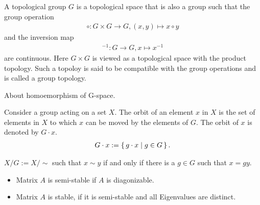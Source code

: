 \begin{defbox}
    \begin{definition}
        A topological group \(G\) is a topological space that is also a group such that the group operation
        \begin{align*}
            \circ: G \times G \longrightarrow G, (x, y) \mapsto x \circ y
        \end{align*}
        and the inversion map
        \begin{align*}
            ^{-1}: G \longrightarrow G, x \mapsto x^{-1}
        \end{align*}
        are continuous. Here \(G \times G\) is viewed as a topological space with the product topology. Such a topoloy is said to be compatible with the group operations and is called a group topology.
    \end{definition}
\end{defbox}

\begin{rembox}
    \begin{remark}
        About homoemorphism of G-space.
    \end{remark}
\end{rembox}

\begin{defbox}
    \begin{definition}
        Consider a group acting on a set \(X\). The orbit of an element \(x\) in \(X\) is the set of elements in \(X\) to which \(x\) can be moved by the elements of \(G\). The orbit of \(x\) is denoted by \(G \cdot x\).
        \begin{align*}
            G \cdot x := \left\{\, g \cdot x \mid g \in G \,\right\} \text{.}
        \end{align*}
    \end{definition}
\end{defbox}

\begin{defbox}
    \begin{definition}
        \(X / G := X / \sim\) such that \(x \sim y\) if and only if there is a \(g \in G\) such that \(x = gy\).
    \end{definition}
\end{defbox}

\begin{defbox}
    \begin{definition}[Hilbert]
        \begin{itemize}
            \item Matrix \(A\) is semi-stable if \(A\) is diagonizable.
            \item Matrix \(A\) is stable, if it is semi-stable and all Eigenvalues are distinct.
        \end{itemize}
    \end{definition}
\end{defbox}

